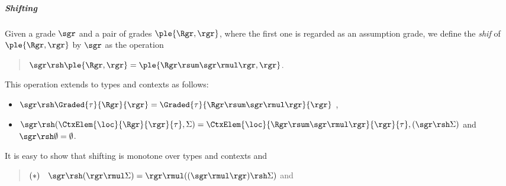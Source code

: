 

\subparagraph*{Shifting}

Given a grade $\sgr$ and a pair of grades $\ple{\Rgr,\rgr}$, where the first one is regarded as an assumption grade, we define the \emph{shif} of $\ple{\Rgr,\rgr}$ by $\sgr$ as the operation 
\begin{quote}
$\sgr\rsh\ple{\Rgr,\rgr} = \ple{\Rgr\rsum\sgr\rmul\rgr,\rgr}$. 
\end{quote}


This operation extends to types and contexts as follows:
\begin{itemize}
\item $\sgr\rsh\Graded{\tau}{\Rgr}{\rgr} = \Graded{\tau}{\Rgr\rsum\sgr\rmul\rgr}{\rgr}$ ,
\item $\sgr\rsh (\CtxElem{\loc}{\Rgr}{\rgr}{\tau},\Sigma)= \CtxElem{\loc}{\Rgr\rsum\sgr\rmul\rgr}{\rgr}{\tau},(\sgr\rsh\Sigma)$ and $\sgr\rsh\emptyset=\emptyset$.
\end{itemize}
It is easy to show that shifting is monotone over types and contexts and 
\begin{quote}
$(\ast)\quad\sgr \rsh (\rgr\rmul\Sigma) = \rgr\rmul ((\sgr\rmul\rgr)\rsh\Sigma)$ and
\end{quote}

